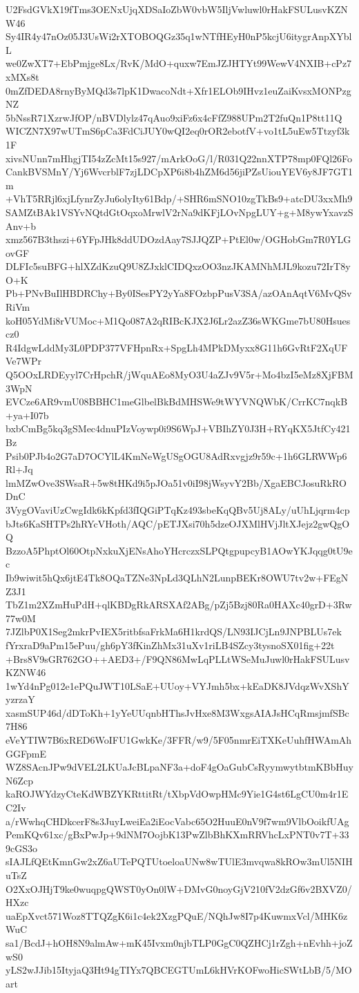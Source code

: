 U2FsdGVkX19fTms3OENxUjqXDSaIoZbW0vbW5IljVwluwl0rHakFSULusvKZNW46
Sy4IR4y47nOz05J3UsWi2rXTOBOQGz35q1wNTfHEyH0nP5kcjU6itygrAnpXYblL
we0ZwXT7+EbPmjge8Lx/RvK/MdO+quxw7EmJZJHTYt99WewV4NXIB+cPz7xMXs8t
0mZfDEDA8rnyByMQd3s7lpK1DwacoNdt+Xfr1ELOb9IHvz1euZaiKvsxMONPzgNZ
5bNssR71XzrwJfOP/nBVDlylz47qAuo9xiFz6x4cFfZ988UPm2T2fuQn1P8tt11Q
WICZN7X97wUTmS6pCa3FdCiJUY0wQI2eq0rOR2ebotfV+vo1tL5uEw5Ttzyf3k1F
xivsNUnn7mHhgjTI54zZcMt15s927/mArkOoG/l/R031Q22nnXTP78mp0FQl26Fo
CankBVSMnY/Yj6WvcrblF7zjLDCpXP6i8b4hZM6d56jiPZsUiouYEV6y8JF7GT1m
+VhT5RRjl6xjLfynrZyJu6olyIty61Bdp/+SHR6mSNO10zgTkBs9+atcDU3xxMh9
SAMZtBAk1VSYvNQtdGtOqxoMrwlV2rNa9dKFjLOvNpgLUY+g+M8ywYxavzSAnv+b
xmz567B3thszi+6YFpJHk8ddUDOzdAay7SJJQZP+PtEl0w/OGHobGm7R0YLGovGF
DLFIc5suBFG+hlXZdKzuQ9U8ZJxklCIDQxzOO3nzJKAMNhMJL9kozu72IrT8yO+K
Pb+PNvBuIlHBDRChy+By0ISesPY2yYa8FOzbpPusV3SA/azOAnAqtV6MvQSvRiVm
koH05YdMi8rVUMoc+M1Qo087A2qRIBcKJX2J6Lr2azZ36sWKGme7bU80Hsuescz0
R4IdgwLddMy3L0PDP377VFHpnRx+SpgLh4MPkDMyxx8G11h6GvRtF2XqUFVe7WPr
Q5OOxLRDEyyl7CrHpchR/jWquAEo8MyO3U4aZJv9V5r+Mo4bzI5eMz8XjFBM3WpN
EVCze6AR9vmU08BBHC1meGlbelBkBdMHSWe9tWYVNQWbK/CrrKC7nqkB+ya+I07b
bxbCmBg5kq3gSMec4dnuPIzVoywp0i9S6WpJ+VBIhZY0J3H+RYqKX5JtfCy421Bz
Psib0PJb4o2G7aD7OCYlL4KmNeWgUSgOGU8AdRxvgjz9r59c+1h6GLRWWp6Rl+Jq
lmMZwOve3SWsaR+5w8tHKd9i5pJOa51v0iI98jWsyvY2Bb/XgaEBCJosuRkRODnC
3VygOVaviUzCwgIdk6kKpfd3fIQGiPTqKz493sbeKqQBv5Uj8ALy/uUhLjqrm4cp
bJts6KaSHTPs2hRYcVHoth/AQC/pETJXsi70h5dzeOJXMlHVjJltXJejz2gwQgOQ
BzzoA5PhptOl60OtpNxkuXjENsAhoYHcrczxSLPQtgpupcyB1AOwYKJqqg0tU9ec
Ib9wiwit5hQx6jtE4Tk8OQaTZNe3NpLd3QLhN2LunpBEKr8OWU7tv2w+FEgNZ3J1
TbZ1m2XZmHuPdH+qlKBDgRkARSXAf2ABg/pZj5Bzj80Ra0HAXc40grD+3Rw77w0M
7JZlbP0X1Seg2mkrPvIEX5ritbfsaFrkMa6H1krdQS/LN93IJCjLn9JNPBLUs7ek
fYrxraD9aPm15ePuu/gh6pY3fKinZhMx31uXv1riLB4SZcy3tysnoSX01fig+22t
+Brs8V9sGR762GO++AED3+/F9QN86MwLqPLLtWSeMuJuwl0rHakFSULusvKZNW46
1wYd4nPg012e1ePQuJWT10LSaE+UUoy+VYJmh5bx+kEaDK8JVdqzWvXShYyzrzaY
xasmSUP46d/dDToKh+1yYeUUqnbHThsJvHxe8M3WxgsAIAJsHCqRmsjmfSBc7H86
eVeYTIW7B6xRED6WoIFU1GwkKe/3FFR/w9/5F05nmrEiTXKeUuhfHWAmAhGGFpmE
WZ8SAcnJPw9dVEL2LKUaJcBLpaNF3a+doF4gOaGubCsRyymwytbtmKBbHuyN6Zcp
kaROJWYdzyCteKdWBZYKRttitRt/tXbpVdOwpHMc9Yie1G4st6LgCU0m4r1EC2Iv
a/rWwhqCHDkcerF8s3JuyLweiEa2iEocVabc65O2HuuE0nV9f7wm9VlbOoikfUAg
PemKQv61xc/gBxPwJp+9dNM7OojbK13PwZlbBhKXmRRVhcLxPNT0v7T+339cGS3o
sIAJLfQEtKmnGw2xZ6aUTePQTUtoeloaUNw8wTUlE3mvqwa8kROw3mUl5NIHuTsZ
O2XxOJHjT9ke0wuqpgQWST0yOn0lW+DMvG0noyGjV210fV2dzGf6v2BXVZ0/HXzc
uaEpXvct571Woz8TTQZgK6i1c4ek2XzgPQuE/NQhJw8I7p4KuwmxVcl/MHK6zWuC
sa1/BcdJ+hOH8N9almAw+mK45Ivxm0njbTLP0GgC0QZHCj1rZgh+nEvhh+joZwS0
yLS2wJJib15ItyjaQ3Ht94gTIYx7QBCEGTUmL6kHVrKOFwoHicSWtLbB/5/MOart
